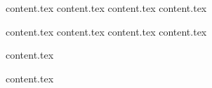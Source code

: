 \documentclass{report}
\begin{document}
    

    \newpage
    \newpage
    
    \titleformat{\chapter}{}{}{0em}{\bf\Huge}

    \afterpage{\blankpage}


    {content.tex}
    {content.tex}
    {content.tex}
    {content.tex}
    

    \tableofcontents


    
    \titleformat{\chapter}[display]{\normalfont\bfseries\Huge}{\chaptertitlename\ \thechapter}{1em}{\bf\Huge}

    \newpage

    {content.tex}
    {content.tex}
    {content.tex}
    {content.tex}

    {content.tex}

    \printbibliography

    \appendix
    {content.tex}

    \afterpage{\blankpage}

\end{document}
